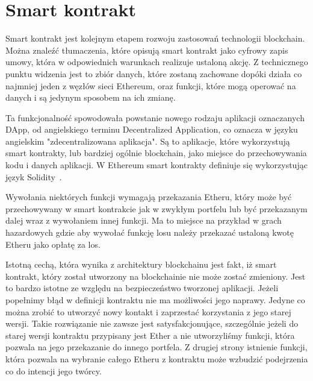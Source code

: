 \documentclass[]{llncs}
\renewcommand{\cite}[1]{~\oldcite{#1}}
\begin{document}
\section{Smart kontrakt}

  Smart kontrakt jest kolejnym etapem rozwoju zastosowań technologii blockchain.
  Można znaleźć tłumaczenia, które opisują smart kontrakt jako cyfrowy zapis
  umowy, która w odpowiednich warunkach realizuje ustaloną akcję. Z technicznego
  punktu widzenia jest to zbiór danych, które zostaną zachowane dopóki działa
  co najmniej jeden z węzłów sieci Ethereum, oraz funkcji, które mogą operować na
  danych i są jedynym sposobem na ich zmianę.

  Ta funkcjonalność spowodowała powstanie nowego rodzaju aplikacji oznaczanych
  DApp, od angielskiego terminu Decentralized Application, co oznacza w języku
  angielskim "zdecentralizowana aplikacja". Są to aplikacje, które wykorzystują
  smart kontrakty, lub bardziej ogólnie blockchain, jako miejsce do
  przechowywania kodu i danych aplikacji. W Ethereum smart kontrakty definiuje
  się wykorzystując język Solidity\cite{solidity-doc}.

  Wywołania niektórych funkcji wymagają przekazania Etheru, który może być
  przechowywany w smart kontrakcie jak w zwykłym portfelu lub być przekazanym
  dalej wraz z wywołaniem innej funkcji. Ma to miejsce na przykład w grach
  hazardowych gdzie aby wywołać funkcję losu należy przekazać ustaloną kwotę
  Etheru jako opłatę za los.

  Istotną cechą, która wynika z architektury blockchainu jest fakt, iż smart
  kontrakt, który został utworzony na blockchainie nie może zostać zmieniony.
  Jest to bardzo istotne ze względu na bezpieczeństwo tworzonej aplikacji.
  Jeżeli popełnimy błąd w definicji kontraktu nie ma możliwości jego naprawy.
  Jedyne co można zrobić to utworzyć nowy kontakt i zaprzestać korzystania z
  jego starej wersji. Takie rozwiązanie nie zawsze jest satysfakcjonujące,
  szczególnie jeżeli do starej wersji kontraktu przypisany jest Ether a nie
  utworzyliśmy funkcji, która pozwala na jego przekazanie do innego portfela. Z
  drugiej strony istnienie funkcji, która pozwala na wybranie całego Etheru z
  kontraktu może wzbudzić podejrzenia co do intencji jego twórcy.
\end{document}
